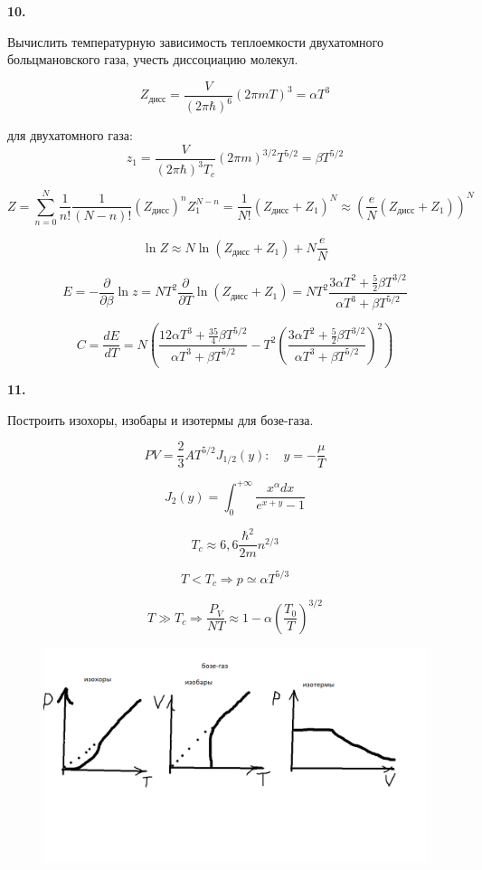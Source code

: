 \documentclass[a4paper,12pt]{article} %
\begin{document}
\begin{ttask} \textbf{10.} 

Вычислить температурную зависимость теплоемкости двухатомного больцмановского газа, учесть диссоциацию молекул. 

\[ Z_{\text{дисс}}=\frac{V}{(2\pi\hbar)^6}(2\pi m T)^3=\alpha T^3 \]

для двухатомного газа:
\[ z_{1}=\frac{V}{(2 \pi \hbar)^{3} T_{c}}\left(2 \pi m\right)^{3 / 2} T^{5 / 2}=\beta T^{5 / 2} \]


\[ Z= \sum_{n=0}^{N} \frac{1}{n!} \frac{1}{(N-n)!}(Z_{\text{дисс}})^n Z^{N-n}_1= \frac{1}{N!}(Z_{\text{дисс}}+Z_1)^N\approx\left(\frac{e}{N}(Z_{\text{дисс}}+Z_1)\right)^N \]

\[ \ln Z \approx N \ln \left(Z_{\text{дисс}}+Z_{1}\right)+N \frac{e}{N} \]


\[ E=-\frac{\partial}{\partial \beta} \ln z=
N T^{2} \frac{\partial}{\partial T} \ln \left(Z_{\text{дисс}}+Z_{1}\right)=
N T^{2} \frac{3 \alpha T^{2}+\frac{5}{2} \beta T^{3 / 2}}{\alpha T^{3}+\beta T^{5 / 2}} \]

\[ C=\frac{dE}{dT}=
N\left(
\frac{12\alpha T^3 +\frac{35}{4}\beta T^{5/2}}{\alpha T^3+\beta T^{5/2}}-
T^2 \left(\frac{3\alpha T^2 +\frac{5}{2}\beta T^{3/2}}{\alpha T^3+\beta T^{5/2}}\right)^2
\right) \]



\end{ttask}


\begin{ttask} \textbf{11.} 

Построить изохоры, изобары и изотермы для бозе-газа. 

\[ P V=\frac{2}{3} A T^{5 / 2} J_{1 / 2}(y): \quad y=-\frac{\mu}{T} \]

\[ J_{2}(y)=\int_{0}^{+\infty} \frac{x^{\alpha} d x}{e^{x+y}-1} \]

\[ T_{c} \approx 6,6 \frac{\hbar^{2}}{2 m} n^{2 / 3} \]

\[ T<T_{c} \Rightarrow p \simeq  \alpha T^{5 / 3} \]


\[ T \gg T_{c}\Rightarrow \frac{P_{V}}{N T} \approx 1-\alpha\left(\frac{T_{0}}{T}\right)^{3 / 2} \]



\begin{figure}[H]
	\centering
	\includegraphics[width=0.7\linewidth]{bosegraphs}
	\caption{}
	\label{fig:fermigraphs}
\end{figure}





\end{ttask}
\end{document}
